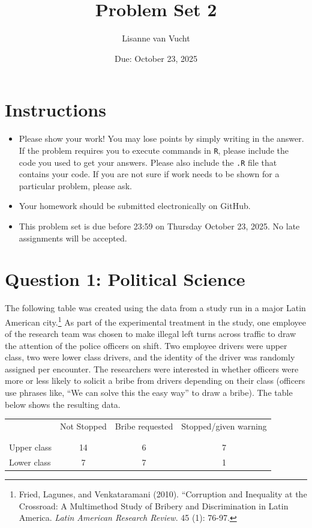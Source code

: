 \documentclass[12pt,letterpaper]{article}
\title{Problem Set 2}
\date{Due: October 23, 2025}
\author{Lisanne van Vucht}
\begin{document}
	\maketitle
	\section*{Instructions}
\begin{itemize}
	\item Please show your work! You may lose points by simply writing in the answer. If the problem requires you to execute commands in \texttt{R}, please include the code you used to get your answers. Please also include the \texttt{.R} file that contains your code. If you are not sure if work needs to be shown for a particular problem, please ask.
	\item Your homework should be submitted electronically on GitHub.
	\item This problem set is due before 23:59 on Thursday October 23, 2025. No late assignments will be accepted.

\end{itemize}

	
	\vspace{.5cm}
	\section*{Question 1: Political Science}
		\vspace{.25cm}
	The following table was created using the data from a study run in a major Latin American city.\footnote{Fried, Lagunes, and Venkataramani (2010). ``Corruption and Inequality at the Crossroad: A Multimethod Study of Bribery and Discrimination in Latin America. \textit{Latin American Research Review}. 45 (1): 76-97.} As part of the experimental treatment in the study, one employee of the research team was chosen to make illegal left turns across traffic to draw the attention of the police officers on shift. Two employee drivers were upper class, two were lower class drivers, and the identity of the driver was randomly assigned per encounter. The researchers were interested in whether officers were more or less likely to solicit a bribe from drivers depending on their class (officers use phrases like, ``We can solve this the easy way'' to draw a bribe). The table below shows the resulting data.

\newpage
\begin{table}[h!]
	\centering
	\begin{tabular}{l | c c c }
		& Not Stopped & Bribe requested & Stopped/given warning \\
		\\[-1.8ex] 
		\hline \\[-1.8ex]
		Upper class & 14 & 6 & 7 \\
		Lower class & 7 & 7 & 1 \\
		\hline
	\end{tabular}
\end{table}
\end{document}
